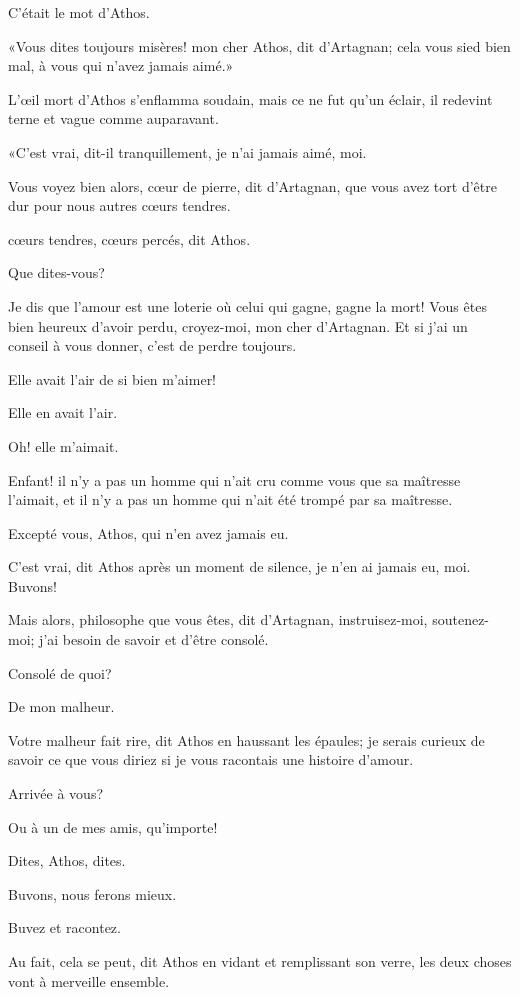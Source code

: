 C'était le mot d'Athos. 

«Vous dites toujours misères! mon cher Athos, dit d'Artagnan; cela vous sied bien mal, à vous qui n'avez jamais aimé.» 

L'œil mort d'Athos s'enflamma soudain, mais ce ne fut qu'un éclair, il redevint terne et vague comme auparavant. 

«C'est vrai, dit-il tranquillement, je n'ai jamais aimé, moi. 

\speak  Vous voyez bien alors, cœur de pierre, dit d'Artagnan, que vous avez tort d'être dur pour nous autres cœurs tendres. 

\speak  cœurs tendres, cœurs percés, dit Athos. 

\speak  Que dites-vous? 

\speak  Je dis que l'amour est une loterie où celui qui gagne, gagne la mort! Vous êtes bien heureux d'avoir perdu, croyez-moi, mon cher d'Artagnan. Et si j'ai un conseil à vous donner, c'est de perdre toujours. 

\speak  Elle avait l'air de si bien m'aimer! 

\speak  Elle en avait l'air. 

\speak  Oh! elle m'aimait. 

\speak  Enfant! il n'y a pas un homme qui n'ait cru comme vous que sa maîtresse l'aimait, et il n'y a pas un homme qui n'ait été trompé par sa maîtresse. 

\speak  Excepté vous, Athos, qui n'en avez jamais eu. 

\speak  C'est vrai, dit Athos après un moment de silence, je n'en ai jamais eu, moi. Buvons! 

\speak  Mais alors, philosophe que vous êtes, dit d'Artagnan, instruisez-moi, soutenez-moi; j'ai besoin de savoir et d'être consolé. 

\speak  Consolé de quoi? 

\speak  De mon malheur. 

\speak  Votre malheur fait rire, dit Athos en haussant les épaules; je serais curieux de savoir ce que vous diriez si je vous racontais une histoire d'amour. 

\speak  Arrivée à vous? 

\speak  Ou à un de mes amis, qu'importe! 

\speak  Dites, Athos, dites. 

\speak  Buvons, nous ferons mieux. 

\speak  Buvez et racontez. 

\speak  Au fait, cela se peut, dit Athos en vidant et remplissant son verre, les deux choses vont à merveille ensemble. 

